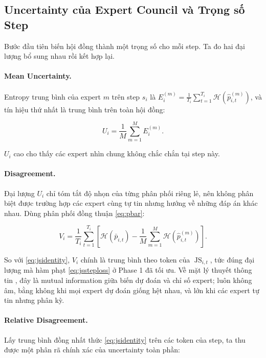 \documentclass[12pt,a4paper]{article}
\DeclareMathOperator{\JS}{JS}
\begin{document}
\subsection{Uncertainty của Expert Council và Trọng số Step}
\label{sec:signals}

Bước đầu tiên biến hội đồng thành một trọng số cho mỗi step. Ta đo hai đại lượng bổ sung nhau rồi kết hợp lại.

\paragraph{Mean Uncertainty.}
Entropy trung bình của expert $m$ trên step $s_i$ là $E_i^{(m)} = \frac{1}{T_i}\sum_{t=1}^{T_i}\mathcal{H}(\hat{p}_{i,t}^{(m)})$, và tín hiệu thứ nhất là trung bình trên toàn hội đồng:

\begin{equation}
\label{eq:U}
U_i = \frac{1}{M}\sum_{m=1}^{M} E_i^{(m)}.
\end{equation}

$U_i$ cao cho thấy các expert nhìn chung không chắc chắn tại step này.

\paragraph{Disagreement.}
Đại lượng $U_i$ chỉ tóm tắt độ nhọn của từng phân phối riêng lẻ, nên không phân biệt được trường hợp các expert cùng tự tin nhưng hướng về những đáp án khác nhau. Dùng phân phối đồng thuận \eqref{eq:pbar}:

\begin{equation}
\label{eq:V}
V_i
=
\frac{1}{T_i}\sum_{t=1}^{T_i}
\left[
\mathcal{H}\!\left(\bar{p}_{i,t}\right)
-
\frac{1}{M}\sum_{m=1}^{M}\mathcal{H}\!\left(\hat{p}_{i,t}^{(m)}\right)
\right].
\end{equation}

So với \eqref{eq:jsidentity}, $V_i$ chính là trung bình theo token của $\JS_{i,t}$, tức đúng đại lượng mà hàm phạt \eqref{eq:jssteploss} ở Phase 1 đã tối ưu. Về mặt lý thuyết thông tin \cite{cover2006elements}, đây là mutual information giữa biến dự đoán và chỉ số expert; luôn không âm, bằng không khi mọi expert dự đoán giống hệt nhau, và lớn khi các expert tự tin nhưng phân kỳ.

\paragraph{Relative Disagreement.}
Lấy trung bình đồng nhất thức \eqref{eq:jsidentity} trên các token của step, ta thu được một phân rã chính xác của uncertainty toàn phần:
\end{document}
